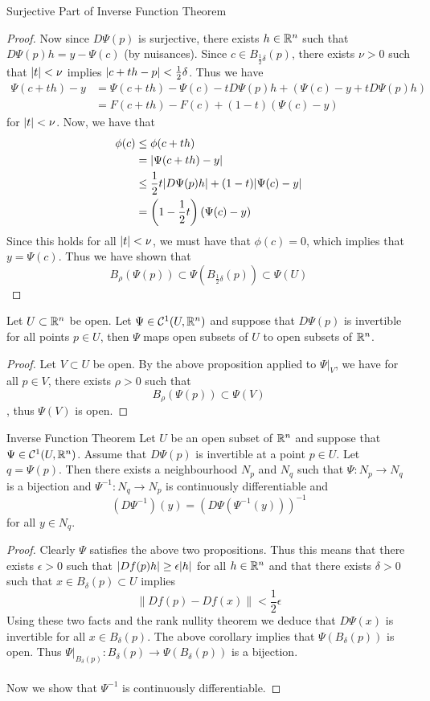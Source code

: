 \documentclass[a4paper]{article}
\begin{document}
\begin{prp}{Surjective Part of Inverse Function Theorem}{}
\begin{proof}
Now since $D\Psi(p)$ is surjective, there exists $h\in\mathbb{R}^n$ such that $D\Psi(p)h=y-\Psi(c)$ (by nuisances). Since $c\in B_{\frac{1}{2}\delta}(p)$, there exists $\nu>0$ such that $\abs{t}<\nu$ implies $\abs{c+th-p}<\frac{1}{2}\delta$. Thus we have 
\begin{align*}
\Psi(c+th)-y&=\Psi(c+th)-\Psi(c)-tD\Psi(p)h+(\Psi(c)-y+tD\Psi(p)h)\\
&=F(c+th)-F(c)+(1-t)(\Psi(c)-y)
\end{align*}
for $\abs{t}<\nu$. 
Now, we have that 
\begin{align*}
\phi(c)&\leq\phi(c+th)\\
&=\abs{\Psi(c+th)-y}\\
&\leq\frac{1}{2}t\abs{D\Psi(p)h}+(1-t)\abs{\Psi(c)-y}\\
&=\left(1-\frac{1}{2}t\right)(\Psi(c)-y)
\end{align*}
Since this holds for all $\abs{t}<\nu$, we must have that $\phi(c)=0$, which implies that $y=\Psi(c)$. Thus we have shown that $$B_\rho(\Psi(p))\subset\Psi(B_{\frac{1}{2}\delta}(p))\subset\Psi(U)$$
\end{proof}
\end{prp}

\begin{crl}{}{} Let $U\subset\mathbb{R}^n$ be open. Let $\Psi\in\mathcal{C}^1(U,\mathbb{R}^n)$ and suppose that $D\Psi(p)$ is invertible for all points $p\in U$, then $\Psi$ maps open subsets of $U$ to open subsets of $\mathbb{R}^n$. \tcbline
\begin{proof}
Let $V\subset U$ be open. By the above proposition applied to $\Psi|_V$, we have for all $p\in V$, there exists $\rho>0$ such that $$B_{\rho}(\Psi(p))\subset\Psi(V)$$, thus $\Psi(V)$ is open. 
\end{proof}
\end{crl}

\begin{thm}{Inverse Function Theorem}{} Let $U$ be an open subset of $\mathbb{R}^n$ and suppose that $\Psi\in\mathcal{C}^1(U,\mathbb{R}^n)$. Assume that $D\Psi(p)$ is invertible at a point $p\in U$. Let $q=\Psi(p)$. Then there exists a neighbourhood $N_p$ and $N_q$ such that $\Psi:N_p\to N_q$ is a bijection and $\Psi^{-1}:N_q\to N_p$ is continuously differentiable and $$(D\Psi^{-1})(y)=(D\Psi(\Psi^{-1}(y)))^{-1}$$ for all $y\in N_q$. \tcbline
\begin{proof}
Clearly $\Psi$ satisfies the above two propositions. Thus this means that there exists $\epsilon>0$ such that $\abs{Df(p)h}\geq\epsilon\abs{h}$ for all $h\in\mathbb{R}^n$ and that there exists $\delta>0$ such that $x\in B_\delta(p)\subset U$ implies $$\|Df(p)-Df(x)\|<\frac{1}{2}\epsilon$$ Using these two facts and the rank nullity theorem we deduce that $D\Psi(x)$ is invertible for all $x\in B_\delta(p)$. The above corollary implies that $\Psi(B_\delta(p))$ is open. Thus $\Psi|_{B_\delta(p)}:B_\delta(p)\to\Psi(B_\delta(p))$ is a bijection. \\~\\
Now we show that $\Psi^{-1}$ is continuously differentiable. 
\end{proof}
\end{thm}
\end{document}

